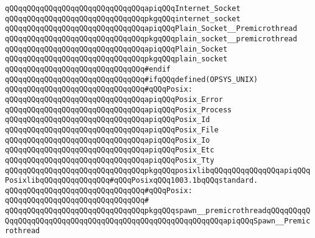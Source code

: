 \newline
\verb|qQQqqQQqqQQqqQQqqQQqqQQqqQQqqQQqapiqQQqInternet_Socket|\newline
\verb|qQQqqQQqqQQqqQQqqQQqqQQqqQQqqQQqpkgqQQqinternet_socket|\newline
\newline
\verb|qQQqqQQqqQQqqQQqqQQqqQQqqQQqqQQqapiqQQqPlain_Socket__Premicrothread|\newline
\verb|qQQqqQQqqQQqqQQqqQQqqQQqqQQqqQQqpkgqQQqplain_socket__premicrothread|\newline
\newline
\verb|qQQqqQQqqQQqqQQqqQQqqQQqqQQqqQQqapiqQQqPlain_Socket|\newline
\verb|qQQqqQQqqQQqqQQqqQQqqQQqqQQqqQQqpkgqQQqplain_socket|\newline
\newline
\verb|qQQqqQQqqQQqqQQqqQQqqQQqqQQqqQQq#endif|\newline
\newline
\verb|qQQqqQQqqQQqqQQqqQQqqQQqqQQqqQQq#ifqQQqdefined(OPSYS_UNIX)|\newline
\verb|qQQqqQQqqQQqqQQqqQQqqQQqqQQqqQQq#qQQqPosix:|\newline
\verb|qQQqqQQqqQQqqQQqqQQqqQQqqQQqqQQqapiqQQqPosix_Error|\newline
\verb|qQQqqQQqqQQqqQQqqQQqqQQqqQQqqQQqapiqQQqPosix_Process|\newline
\verb|qQQqqQQqqQQqqQQqqQQqqQQqqQQqqQQqapiqQQqPosix_Id|\newline
\verb|qQQqqQQqqQQqqQQqqQQqqQQqqQQqqQQqapiqQQqPosix_File|\newline
\verb|qQQqqQQqqQQqqQQqqQQqqQQqqQQqqQQqapiqQQqPosix_Io|\newline
\verb|qQQqqQQqqQQqqQQqqQQqqQQqqQQqqQQqapiqQQqPosix_Etc|\newline
\verb|qQQqqQQqqQQqqQQqqQQqqQQqqQQqqQQqapiqQQqPosix_Tty|\newline
\verb|qQQqqQQqqQQqqQQqqQQqqQQqqQQqqQQqpkgqQQqposixlibqQQqqQQqqQQqqQQqapiqQQqPosixlibqQQqqQQqqQQqqQQq#qQQqPosixqQQq1003.1bqQQqstandard.|\newline
\newline
\verb|qQQqqQQqqQQqqQQqqQQqqQQqqQQqqQQq#qQQqPosix:|\newline
\verb|qQQqqQQqqQQqqQQqqQQqqQQqqQQqqQQq#|\newline
\verb|qQQqqQQqqQQqqQQqqQQqqQQqqQQqqQQqpkgqQQqspawn__premicrothreadqQQqqQQqqQQqqQQqqQQqqQQqqQQqqQQqqQQqqQQqqQQqqQQqqQQqqQQqqQQqapiqQQqSpawn__Premicrothread|\newline
\newline
